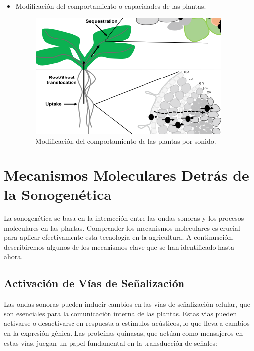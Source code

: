 \documentclass[twocolumn]{article}
\begin{document}
\begin{itemize}
    \item Modificación del comportamiento o capacidades de las plantas.
    \begin{figure}[!h]
        \centering
        \includegraphics[width=\linewidth]{imagenes/Captura3.PNG}
        \caption{Modificación del comportamiento de las plantas por sonido.}
        \label{fig:modificacion}
    \end{figure}
\end{itemize}

\section{Mecanismos Moleculares Detrás de la Sonogenética}

La sonogenética se basa en la interacción entre las ondas sonoras y los procesos moleculares en las plantas.
 Comprender los mecanismos moleculares es crucial para aplicar efectivamente esta tecnología en la agricultura.
  A continuación, describiremos algunos de los mecanismos clave que se han identificado hasta ahora.

\subsection{Activación de Vías de Señalización}

Las ondas sonoras pueden inducir cambios en las vías de señalización celular, que son esenciales para la comunicación interna
 de las plantas. Estas vías pueden activarse o desactivarse en respuesta a estímulos acústicos, lo que lleva a cambios en la 
 expresión génica. Las proteínas quinasas, que actúan como mensajeros en estas vías, juegan un papel fundamental en la transducción
  de señales:
\end{document}
